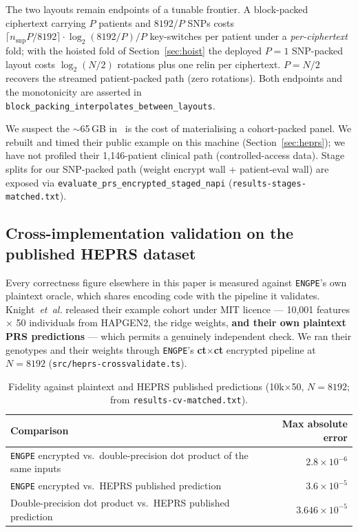 \documentclass[11pt,a4paper]{article}
\newcommand{\engpe}{\texttt{ENGPE}}
\DeclareRobustCommand{\code}[1]{\texttt{#1}}
\DeclareRobustCommand{\file}[1]{\texttt{#1}}
\begin{document}
The two layouts remain endpoints of a tunable frontier. A block-packed ciphertext
carrying $P$ patients and $8192/P$ SNPs costs
$\lceil n_{\mathrm{snp}} P / 8192\rceil \cdot \log_2(8192/P) / P$ key-switches per
patient under a \textit{per-ciphertext} fold; with the hoisted fold of
Section~\ref{sec:hoist} the deployed $P = 1$ SNP-packed layout costs
$\log_2(N/2)$ rotations plus one relin per ciphertext. $P = N/2$ recovers the
streamed patient-packed path (zero rotations). Both endpoints and the monotonicity
are asserted in \code{block\_packing\_interpolates\_between\_layouts}.

We suspect the $\sim$65\,GB in~\cite{knight2026heprs} is the cost of materialising
a cohort-packed panel. We rebuilt and timed their public example on this machine
(Section~\ref{sec:heprs}); we have not profiled their 1{,}146-patient clinical path
(controlled-access data). Stage splits for our SNP-packed path (weight encrypt wall
+ patient-eval wall) are exposed via
\code{evaluate\_prs\_encrypted\_staged\_napi}
(\file{results-stages-matched.txt}).

\subsection{Cross-implementation validation on the published HEPRS dataset}
\label{sec:crossval}

Every correctness figure elsewhere in this paper is measured against \engpe{}'s
own plaintext oracle, which shares encoding code with the pipeline it validates.
Knight~\textit{et~al.} released their example cohort under MIT licence ---
10{,}001 features $\times$ 50 individuals from HAPGEN2, the ridge weights,
\textbf{and their own plaintext PRS predictions} --- which permits a genuinely
independent check. We ran their genotypes and their weights through \engpe{}'s
\textbf{ct$\times$ct} encrypted pipeline at $N = 8192$
(\file{src/heprs-crossvalidate.ts}).

\begin{table}[ht]
\centering
\caption{Fidelity against plaintext and HEPRS published predictions
  (10k$\times$50, $N{=}8192$; from \texttt{results-cv-matched.txt}).}
\label{tab:cv}
\small
\begin{tabular}{@{}lr@{}}
\toprule
Comparison & Max absolute error \\
\midrule
\engpe{} encrypted vs.\ double-precision dot product of the same inputs
  & $2.8\times10^{-6}$ \\
\engpe{} encrypted vs.\ HEPRS published prediction
  & $3.6\times10^{-5}$ \\
Double-precision dot product vs.\ HEPRS published prediction
  & $3.646\times10^{-5}$ \\
\bottomrule
\end{tabular}
\end{table}
\end{document}
